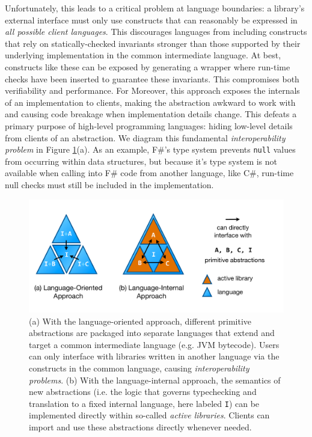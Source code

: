 \documentclass{llncs}
\begin{document}
Unfortunately, this leads to a critical problem at language boundaries: a library's external interface must only use constructs that can reasonably be expressed in \emph{all possible client languages}. This discourages languages from including constructs that rely on statically-checked invariants stronger than those supported by their underlying implementation in the common intermediate language. At best, constructs like these can be exposed by generating a wrapper where run-time checks have been inserted to guarantee these invariants. This compromises both verifiability and performance. For%
Moreover, this approach exposes the internals of an implementation to clients, making the abstraction awkward to work with and causing code breakage when implementation details change. This defeats a primary purpose of high-level programming languages: hiding low-level details from clients of an abstraction. We diagram this fundamental \emph{interoperability problem} in Figure \ref{approaches}(a). As an example, F\#'s type system prevents \lstinline{null} values from occurring within data structures, but because it's type system is not available when calling into F\# code from another language, like C\#, run-time null checks must still be included in the implementation.
\begin{figure}[t]
\vspace{-15px}
\includegraphics[scale=0.415]{approaches.pdf}
\vspace{-30px}
\caption{(a) With the language-oriented approach, different primitive abstractions are packaged into separate languages that extend and target a common intermediate language (e.g. JVM bytecode). Users can only interface with libraries written in another language via the constructs in the common language, causing \emph{interoperability problems}. (b) With the language-internal approach, the semantics of new abstractions (i.e. the logic that governs typechecking and translation to a fixed {internal language}, here labeled \texttt{I}) can be implemented directly within so-called \emph{active libraries}. Clients can import and use these abstractions directly whenever needed.}
\vspace{-10px}
\label{approaches}
\end{figure}
\end{document}
